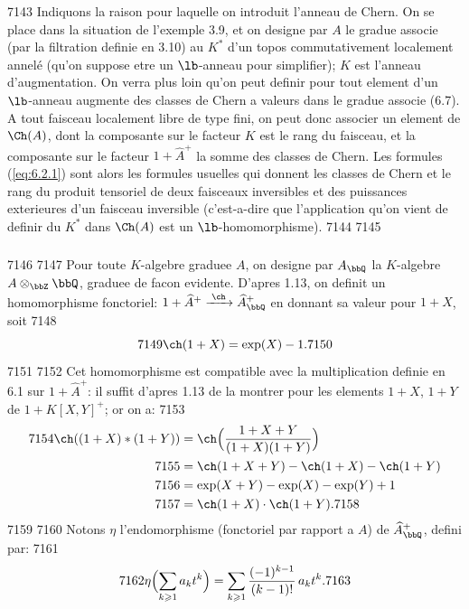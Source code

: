   7143	Indiquons la raison pour laquelle on introduit l'anneau de Chern. On se place dans la situation de l'exemple 3.9, et on designe par $A$ le gradue associe (par la filtration definie en 3.10) au $K^*$ d'un topos commutativement localement annel\'e (qu'on suppose etre un $\lb$-anneau pour simplifier); $K$ est l'anneau d'augmentation. On verra plus loin qu'on peut definir pour tout element d'un $\lb$-anneau augmente des classes de Chern a valeurs dans le gradue associe (6.7). A tout faisceau localement libre de type fini, on peut donc associer un element de $\Ch(A)$, dont la composante sur le facteur $K$ est le rang du faisceau, et la composante sur le facteur $1 + \widehat{A}^+$ la somme des classes de Chern. Les formules (\ref{eq:6.2.1}) sont alors les formules usuelles qui donnent les classes de Chern et le rang du produit tensoriel de deux faisceaux inversibles et des puissances exterieures d'un faisceau inversible (c'est-a-dire que l'application qu'on vient de definir du $K^*$ dans $\Ch(A)$ est un $\lb$-homomorphisme).
  7144	
  7145	\subsubsection{}
  7146	
  7147	Pour toute $K$-algebre graduee $A$, on designe par $A_{\bbQ}$ la $K$-algebre $A \otimes_{\bbZ} \bbQ$, graduee de facon evidente. D'apres 1.13, on definit un homomorphisme fonctoriel: $1 + \widehat{A}^+ \xrightarrow{\;\ch\;} \widehat{A}_{\bbQ}^+$ en donnant sa valeur pour $1+X$, soit
  7148	\begin{equation}\label{eq:6.3.1}
  7149	\ch(1+X) = \exp(X) - 1.
  7150	\end{equation}
  7151	
  7152	Cet homomorphisme est compatible avec la multiplication definie en 6.1 sur $1 + \widehat{A}^+$: il suffit d'apres 1.13 de la montrer pour les elements $1+X$, $1+Y$ de $1 + K[X,Y]^+$; or on a:
  7153	\begin{align*}
  7154	\ch((1+X)*(1+Y)) &= \ch\Bigl(\frac{1+X+Y}{(1+X)(1+Y)}\Bigr) \\
  7155	&= \ch(1+X+Y) - \ch(1+X) - \ch(1+Y) \\
  7156	&= \exp(X+Y) - \exp(X) - \exp(Y) + 1 \\
  7157	&= \ch(1+X) \cdot \ch(1+Y).
  7158	\end{align*}
  7159	
  7160	Notons $\eta$ l'endomorphisme (fonctoriel par rapport a $A$) de $\widehat{A}_{\bbQ}^+$, defini par:
  7161	\[
  7162	\eta\Bigl(\sum_{k \geqslant 1} a_k t^k\Bigr) = \sum_{k \geqslant 1} \frac{(-1)^{k-1}}{(k-1)!}\, a_k t^k.
  7163	\]
